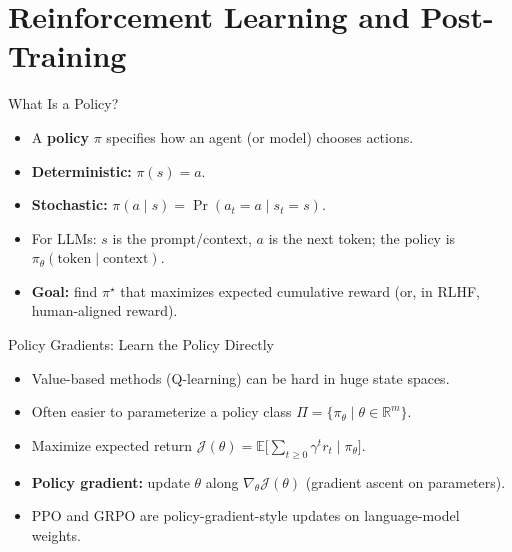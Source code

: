 \section{Reinforcement Learning and Post-Training}

\begin{frame}{What Is a Policy?}
  \begin{itemize}\itemsep0.4em
    \item[\textcolor{red}{$\blacktriangleright$}] A \textbf{policy} $\pi$ specifies how an agent (or model) chooses actions.
    \item[\textcolor{red}{$\blacktriangleright$}] \textbf{Deterministic:} $\pi(s) = a$.
    \item[\textcolor{red}{$\blacktriangleright$}] \textbf{Stochastic:} $\pi(a \mid s) = \Pr(a_t = a \mid s_t = s)$.
    \item[\textcolor{red}{$\blacktriangleright$}] For LLMs: $s$ is the prompt/context, $a$ is the next token; the policy is $\pi_\theta(\text{token} \mid \text{context})$.
    \item[\textcolor{red}{$\blacktriangleright$}] \textbf{Goal:} find $\pi^\star$ that maximizes expected cumulative reward (or, in RLHF, human-aligned reward).
  \end{itemize}
\end{frame}

\begin{frame}{Policy Gradients: Learn the Policy Directly}
  \begin{itemize}\itemsep0.35em
    \item[\textcolor{red}{$\blacktriangleright$}] Value-based methods (Q-learning) can be hard in huge state spaces.
    \item[\textcolor{red}{$\blacktriangleright$}] Often easier to parameterize a policy class $\Pi = \{\pi_\theta \mid \theta \in \mathbb{R}^m\}$.
    \item[\textcolor{red}{$\blacktriangleright$}] Maximize expected return $\mathcal{J}(\theta) = \mathbb{E}\big[\sum_{t \geq 0} \gamma^t r_t \mid \pi_\theta\big]$.
    \item[\textcolor{red}{$\blacktriangleright$}] \textbf{Policy gradient:} update $\theta$ along $\nabla_\theta \mathcal{J}(\theta)$ (gradient ascent on parameters).
    \item[\textcolor{red}{$\blacktriangleright$}] PPO and GRPO are policy-gradient-style updates on language-model weights.
  \end{itemize}
\end{frame}

